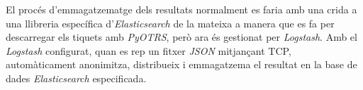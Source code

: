 El procés d'emmagatzematge dels resultats normalment es faria amb una crida a una llibreria específica d'\textit{Elasticsearch} de la mateixa a manera que es fa per descarregar els tiquets amb \textit{PyOTRS}, però ara és gestionat per \textit{Logstash}. Amb el \textit{Logstash} configurat, quan es rep un fitxer \textit{JSON} mitjançant TCP, automàticament anonimitza, distribueix i emmagatzema el resultat en la base de dades \textit{Elasticsearch} especificada.